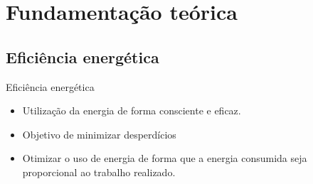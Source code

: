 \section{Fundamentação teórica}




\subsection{Eficiência energética}
\begin{frame}{Eficiência energética}
    \begin{itemize}
        \item Utilização da energia de forma consciente e eficaz.
        \item Objetivo de minimizar desperdícios
        \item Otimizar o uso de energia de forma que a energia consumida seja proporcional ao trabalho realizado.
    \end{itemize}
\end{frame}

